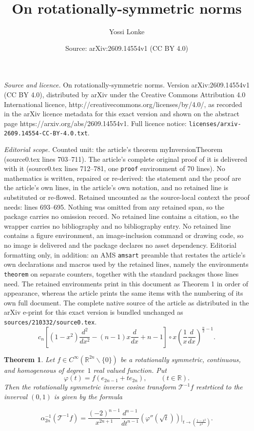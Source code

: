 \documentclass[10pt,a4paper]{amsart}
\title{On rotationally-symmetric norms}
\author{Yossi Lonke}
\date{Source: arXiv:2609.14554v1 (CC BY 4.0)}
\newtheorem{theorem}{Theorem}
\newcommand\Ren[1]{\mathbb{R}^{#1}}
\newcommand\ar{\mathbb{R}}
\newcommand{\inverseCT}{{\mathcal T}^{-1}}
\begin{document}
\maketitle

\noindent\emph{Source and licence.} On rotationally-symmetric norms. Version arXiv:2609.14554v1 (CC BY 4.0), distributed by arXiv under the Creative Commons Attribution 4.0 International licence, http://creativecommons.org/licenses/by/4.0/, as recorded in the arXiv licence metadata for this exact version and shown on the abstract page https://arxiv.org/abs/2609.14554v1. Full licence notice: \texttt{licenses/arxiv-2609.14554-CC-BY-4.0.txt}.\par\smallskip

\noindent\textit{Editorial scope.} Counted unit: the article's theorem myInversionTheorem (source0.tex lines 703--711). The article's complete original proof of it is delivered with it (source0.tex lines 712--781, one \texttt{proof} environment of 70 lines). No mathematics is written, repaired or re-derived: the statement and the proof are the article's own lines, in the article's own notation, and no retained line is substituted or re-flowed.  Retained uncounted as the source-local context the proof needs: lines 693--695.  Nothing was omitted from any retained span, so the package carries no omission record.  No retained line contains a citation, so the wrapper carries no bibliography and no bibliography entry.  No retained line contains a figure environment, an image-inclusion command or drawing code, so no image is delivered and the package declares no asset dependency.  Editorial formatting only, in addition: an AMS \texttt{amsart} preamble that restates the article's own declarations and macros used by the retained lines, namely the environments \texttt{theorem} on separate counters, together with the standard packages those lines need.  The retained environments print in this document as Theorem 1 in order of appearance, whereas the article prints the same items with the numbering of its own full document.  The complete native source of the article as distributed in the arXiv e-print for this exact version is bundled unchanged as \texttt{sources/210332/source0.tex}.
\begin{equation}\label{differentialOperator}
c_n\left [(1-x^2)\frac{d^2}{dx^2}-(n-1)x\frac{d}{dx}+n-1\right]\circ x\left (\frac{1}{x}\frac{d}{dx}\right)^{\frac{n}{2}-1}.
\end{equation}

\begin{theorem}\label{myInversionTheorem}
Let $f\in C^{\infty}(\Ren{2n}\backslash\{0\})$ be a rotationally symmetric, continuous, and homogeneous of degree~$1$ real valued function. Put
\[ \varphi(t)=f(e_{2n-1}+te_{2n}),\qquad (t\in\ar). \]
Then the rotationally symmetric inverse cosine transform  $\inverseCT f$ restrticed to  the inverval $(0,1)$ is given by the formula 

\begin{equation}\label{myInversionFormula}
 \alpha_{2n}^{-1}(\inverseCT f)=\frac{(-2)^{n-1}}{x^{2n+1}}\frac{d^{n-1}}{dt^{n-1}}(\varphi''(\sqrt{t}))\Big|_{t\to (\frac{1-x^2}{x^2})}.
\end{equation}
\end{theorem}
\end{document}

